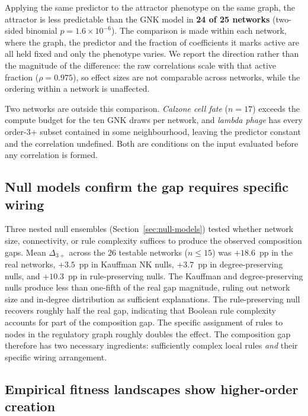 \documentclass[10pt]{article}
\begin{document}
Applying the same predictor to the attractor phenotype on the same
graph, the attractor is less predictable than the GNK model in
\textbf{24 of 25 networks} (two-sided binomial $p = 1.6 \times
10^{-6}$). The comparison is made within each network, where the graph,
the predictor and the fraction of coefficients it marks active are all
held fixed and only the phenotype varies. We report the direction rather
than the magnitude of the difference: the raw correlations scale with
that active fraction ($\rho = 0.975$), so effect sizes are not
comparable across networks, while the ordering within a network is
unaffected.

Two networks are outside this comparison. \emph{Calzone cell fate}
($n = 17$) exceeds the compute budget for the ten GNK draws per network,
and \emph{lambda phage} has every order-3+ subset contained in some
neighbourhood, leaving the predictor constant and the correlation
undefined. Both are conditions on the input evaluated before any
correlation is formed.


\subsection{Null models confirm the gap requires specific wiring}
\label{sec:null-results}

Three nested null ensembles (Section~\ref{sec:null-models}) tested
whether network size, connectivity, or rule complexity suffices to
produce the observed composition gaps. Mean $\Delta_{3+}$ across the
26 testable networks ($n \leq 15$) was $+18.6$~pp in the real
networks, $+3.5$~pp in Kauffman NK nulls, $+3.7$~pp in
degree-preserving nulls, and $+10.3$~pp in rule-preserving nulls.
The Kauffman and degree-preserving nulls produce less than one-fifth
of the real gap magnitude, ruling out network size and in-degree
distribution as sufficient explanations. The rule-preserving null
recovers roughly half the real gap, indicating that Boolean rule
complexity accounts for part of the composition gap. The specific
assignment of rules to nodes in the regulatory graph roughly doubles
the effect. The composition gap therefore has two necessary
ingredients: sufficiently complex local rules \emph{and} their
specific wiring arrangement.


\subsection{Empirical fitness landscapes show higher-order creation}
\label{sec:empirical-results}
\end{document}
